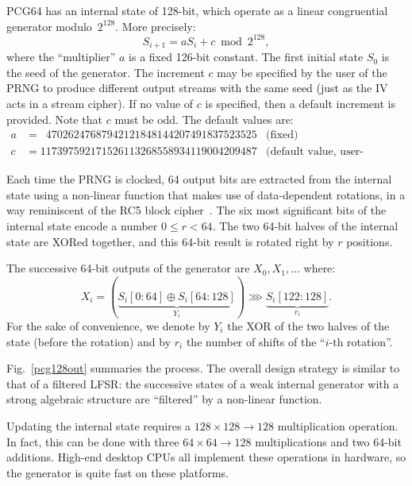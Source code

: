 \documentclass[journal=tosc,final]{iacrtrans}
\begin{document}
\textsf{PCG64} has an internal state of 128-bit, which operate as a linear
congruential generator modulo~$2^{128}$. More precisely:
\[
  S_{i+1} = a S_i + c \bmod 2^{128},
\]
where the ``multiplier'' $a$ is a fixed 126-bit constant. The first initial state $S_0$ is the seed of
the generator. The increment $c$ may be specified by the user of the PRNG to
produce different output streams with the same seed (just as the IV acts in a
stream cipher). If no value of $c$ is specified, then a default increment is
provided. Note that $c$ must be odd. The default values are:
\begin{align*}
  a &= \phantom{1}47026247687942121848144207491837523525 & \text{(fixed)}\\
  c &= 117397592171526113268558934119004209487           & \text{(default value, user-definable)}
\end{align*}

Each time the PRNG is clocked, 64 output bits are extracted from the internal
state using a non-linear function that makes use of data-dependent rotations, in
a way reminiscent of the \textsf{RC5} block cipher~\cite{Rivest94}. The six most
significant bits of the internal state encode a number $0 \leq r < 64$. The two
64-bit halves of the internal state are XORed together, and this 64-bit result
is rotated right by $r$ positions.

The successive 64-bit outputs of the generator are $X_0, X_1, \dots$ where:
\begin{equation}\label{eq:output}
  X_i =(\underbrace{S_i[0:64] \oplus S_i[64:128]}_{Y_i}) \ggg \underbrace{S_i[122:128]}_{r_i}.
\end{equation}
For the sake of convenience, we denote by $Y_i$ the XOR of the two halves of the
state (before the rotation) and by $r_i$ the number of shifts of the ``$i$-th
rotation''.

Fig.~\ref{pcg128out} summaries the process. The overall design strategy is
similar to that of a filtered LFSR: the successive states of a weak internal
generator with a strong algebraic structure are ``filtered'' by a non-linear
function.

Updating the internal state requires a $128 \times 128 \rightarrow 128$
multiplication operation. In fact, this can be done with three
$64 \times 64 \rightarrow 128$ multiplications and two 64-bit additions. High-end
desktop CPUs all implement these operations in hardware, so the generator is
quite fast on these platforms.
\end{document}
